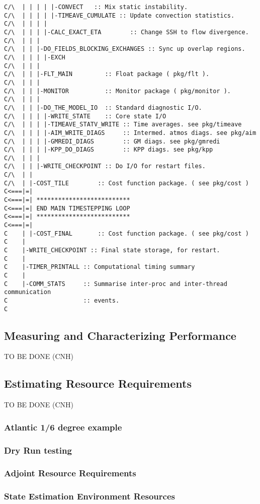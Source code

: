 {\begin{verbatim}
C/\  | | | | |-CONVECT   :: Mix static instability.
C/\  | | | | |-TIMEAVE_CUMULATE :: Update convection statistics.
C/\  | | | | 
C/\  | | | |-CALC_EXACT_ETA        :: Change SSH to flow divergence.     
C/\  | | |
C/\  | | |-DO_FIELDS_BLOCKING_EXCHANGES :: Sync up overlap regions.
C/\  | | | |-EXCH                                                   
C/\  | | |
C/\  | | |-FLT_MAIN         :: Float package ( pkg/flt ).
C/\  | | |
C/\  | | |-MONITOR          :: Monitor package ( pkg/monitor ).
C/\  | | |
C/\  | | |-DO_THE_MODEL_IO  :: Standard diagnostic I/O.
C/\  | | | |-WRITE_STATE    :: Core state I/O
C/\  | | | |-TIMEAVE_STATV_WRITE :: Time averages. see pkg/timeave
C/\  | | | |-AIM_WRITE_DIAGS     :: Intermed. atmos diags. see pkg/aim
C/\  | | | |-GMREDI_DIAGS        :: GM diags. see pkg/gmredi
C/\  | | | |-KPP_DO_DIAGS        :: KPP diags. see pkg/kpp
C/\  | | |
C/\  | | |-WRITE_CHECKPOINT :: Do I/O for restart files.
C/\  | |
C/\  | |-COST_TILE        :: Cost function package. ( see pkg/cost )
C<===|=|
C<===|=| **************************
C<===|=| END MAIN TIMESTEPPING LOOP
C<===|=| **************************
C<===|=|
C    | |-COST_FINAL       :: Cost function package. ( see pkg/cost )
C    |
C    |-WRITE_CHECKPOINT :: Final state storage, for restart.
C    |
C    |-TIMER_PRINTALL :: Computational timing summary
C    |
C    |-COMM_STATS     :: Summarise inter-proc and inter-thread communication
C                     :: events.
C 
\end{verbatim}
}

\subsection{Measuring and Characterizing Performance}

TO BE DONE (CNH)

\subsection{Estimating Resource Requirements}

TO BE DONE (CNH) 

\subsubsection{Atlantic 1/6 degree example}
\subsubsection{Dry Run testing}
\subsubsection{Adjoint Resource Requirements}
\subsubsection{State Estimation Environment Resources}

